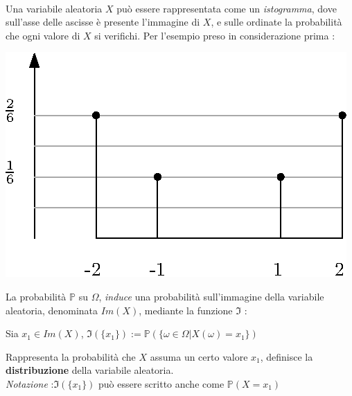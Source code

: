 \documentclass[12pt, letterpaper]{article}
\newcommand{\Prob}{{\mathbb P}}
\begin{document}
 \\ Una variabile aleatoria \(X\) può essere rappresentata come un \textit{istogramma}, dove sull'asse delle 
 ascisse è presente l'immagine di \(X\), e sulle ordinate la probabilità che ogni valore di \(X\) si verifichi.
 Per l'esempio preso in considerazione prima :
 \\\begin{center}
    \includegraphics[scale=1.5]{images/istogramma.eps}
\end{center}
La probabilità \(\mathbb{P}\) su \(\Omega\), \textit{induce} una probabilità sull'immagine 
della variabile aleatoria, denominata \(Im(X)\), mediante la funzione \(\Im\) :
\begin{center}
    Sia \(x_1\in Im(X)\), \(\Im(\{x_1\}):=\mathbb{P}(\{\omega\in\Omega|X(\omega)=x_1\})\)
\end{center}
Rappresenta la probabilità che \(X\) assuma un certo valore \(x_1\), definisce la \textbf{distribuzione}
della variabile aleatoria.
\\\textit{Notazione} :\(\Im(\{x_1\})\) può essere scritto anche come \(\Prob(X=x_1)\)
\end{document}
